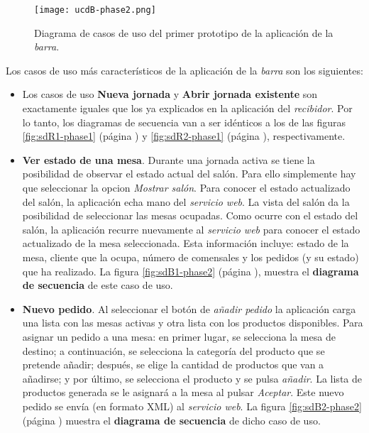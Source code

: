   \begin{figure}[H]
    \begin{center}
      \texttt{[image: ucdB-phase2.png]}
      \caption{Diagrama de casos de uso del primer prototipo de la aplicación
      de la \emph{barra}.}
      \label{fig:ucdB-phase2}
    \end{center}
  \end{figure}

Los casos de uso más característicos de la aplicación de la \emph{barra} son
los siguientes:
\begin{itemize}
\item Los casos de uso \textbf{Nueva jornada} y \textbf{Abrir jornada
existente} son exactamente iguales que los ya explicados en la aplicación
del \emph{recibidor}. Por lo tanto, los diagramas de secuencia van a ser 
idénticos a los de las figuras \ref{fig:sdR1-phase1} (página
\pageref{fig:sdR1-phase1}) y \ref{fig:sdR2-phase1} (página
\pageref{fig:sdR2-phase1}), respectivamente.
\item \textbf{Ver estado de una mesa}. Durante una jornada activa se tiene
la posibilidad de observar el estado actual del salón. Para ello simplemente
hay que seleccionar la opcion \emph{Mostrar salón}. Para conocer el estado
actualizado del salón, la aplicación echa mano del \emph{servicio web}.
La vista del salón da la posibilidad de seleccionar las mesas ocupadas. Como
ocurre con el estado del salón, la aplicación recurre nuevamente al
\emph{servicio web} para conocer el estado actualizado de la mesa seleccionada.
Esta información incluye: estado de la mesa, cliente que la ocupa, número
de comensales y los pedidos (y su estado) que ha realizado. La figura
\ref{fig:sdB1-phase2} (página \pageref{fig:sdB1-phase2}), muestra el
\textbf{diagrama de secuencia} de este caso de uso.

\item \textbf{Nuevo pedido}. Al seleccionar el botón de \emph{añadir pedido}
la aplicación carga una lista con las mesas activas y otra lista con los
productos disponibles. Para asignar un pedido a una mesa: en primer lugar, se
selecciona la mesa de destino; a continuación, se selecciona la categoría
del producto que se pretende añadir; después, se elige la cantidad de
productos que van a añadirse; y por último, se selecciona el producto y se
pulsa \emph{añadir}. La lista de productos generada se le asignará a la mesa
al pulsar \emph{Aceptar}. Este nuevo pedido se envía (en formato \acs{XML})
al \emph{servicio web}. La figura \ref{fig:sdB2-phase2} (página
\pageref{fig:sdB2-phase2}) muestra el \textbf{diagrama de secuencia} de dicho
caso de uso.


\end{itemize}
